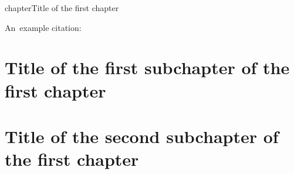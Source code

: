 chapter{Title of the first chapter}

An~example citation: \cite{Andel07}

\section{Title of the first subchapter of the first chapter}

\section{Title of the second subchapter of the first chapter}
